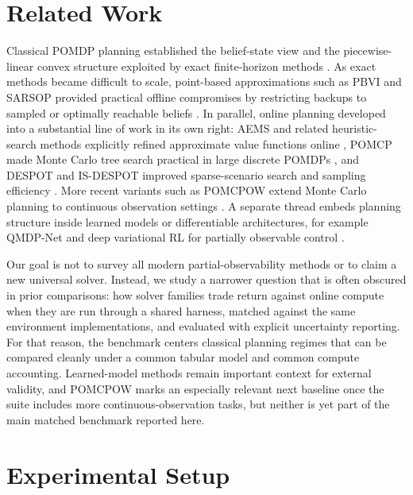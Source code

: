 \documentclass[10pt,twocolumn]{article}
\begin{document}
\section{Related Work}
Classical POMDP planning established the belief-state view and the piecewise-linear convex structure exploited by exact finite-horizon methods \citep{kaelbling1998planning,smallwood1973optimal,littman1994witness}. As exact methods became difficult to scale, point-based approximations such as PBVI and SARSOP provided practical offline compromises by restricting backups to sampled or optimally reachable beliefs \citep{pineau2003pbvi,kurniawati2008sarsop}. In parallel, online planning developed into a substantial line of work in its own right: AEMS and related heuristic-search methods explicitly refined approximate value functions online \citep{ross2007aems,ross2008online}, POMCP made Monte Carlo tree search practical in large discrete POMDPs \citep{silver2010pomcp}, and DESPOT and IS-DESPOT improved sparse-scenario search and sampling efficiency \citep{somani2013despot,luo2019isdespot}. More recent variants such as POMCPOW extend Monte Carlo planning to continuous observation settings \citep{sunberg2017pomcpow}. A separate thread embeds planning structure inside learned models or differentiable architectures, for example QMDP-Net and deep variational RL for partially observable control \citep{karkus2017qmdpnet,igl2018dvrl}.

Our goal is not to survey all modern partial-observability methods or to claim a new universal solver. Instead, we study a narrower question that is often obscured in prior comparisons: how solver families trade return against online compute when they are run through a shared harness, matched against the same environment implementations, and evaluated with explicit uncertainty reporting. For that reason, the benchmark centers classical planning regimes that can be compared cleanly under a common tabular model and common compute accounting. Learned-model methods remain important context for external validity, and POMCPOW marks an especially relevant next baseline once the suite includes more continuous-observation tasks, but neither is yet part of the main matched benchmark reported here.

\section{Experimental Setup}
\end{document}
